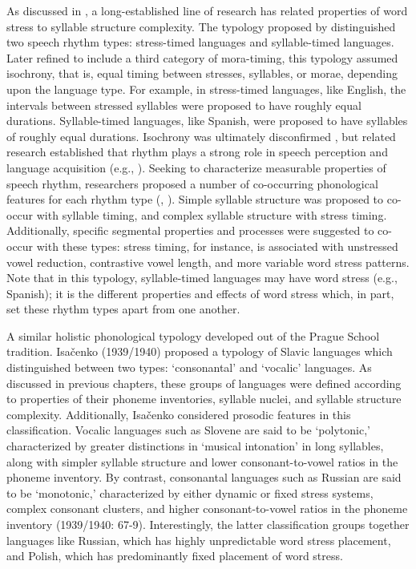   As discussed in , a long-established line of research has related properties of word stress to syllable structure complexity. The typology proposed by \citet{Pike1945} distinguished two speech rhythm types: stress-timed languages and syllable-timed languages. Later refined to include a third category of mora-timing, this typology assumed isochrony, that is, equal timing between stresses, syllables, or morae, depending upon the language type. For example, in stress-timed languages, like English, the intervals between stressed syllables were proposed to have roughly equal durations. Syllable-timed languages, like Spanish, were proposed to have syllables of roughly equal durations. Isochrony was ultimately disconfirmed \citep{Roach1982}, but related research established that rhythm plays a strong role in speech perception and language acquisition (e.g., \citealt{CutlerMehler1993}). Seeking to characterize measurable properties of speech rhythm, researchers proposed a number of co-occurring phonological features for each rhythm type (\citealt{Dauer1983}, \citealt{Auer1993}). Simple syllable structure was proposed to co-occur with syllable timing, and complex syllable structure with stress timing. Additionally, specific segmental properties and processes were suggested to co-occur with these types: stress timing, for instance, is associated with unstressed vowel reduction, contrastive vowel length, and more variable word stress patterns. Note that in this typology, syllable-timed languages may have word stress (e.g., Spanish); it is the different properties and effects of word stress which, in part, set these rhythm types apart from one another.

  A similar holistic phonological typology developed out of the Prague School tradition. Isačenko (1939/1940) proposed a typology of Slavic languages which distinguished between two types: ‘consonantal’ and ‘vocalic’ languages. As discussed in previous chapters, these groups of languages were defined according to properties of their phoneme inventories, syllable nuclei, and syllable structure complexity. Additionally, Isačenko considered prosodic features in this classification. Vocalic languages such as Slovene are said to be ‘polytonic,’ characterized by greater distinctions in ‘musical intonation’ in long syllables, along with simpler syllable structure and lower consonant-to-vowel ratios in the phoneme inventory. By contrast, consonantal languages such as Russian are said to be ‘monotonic,’ characterized by either dynamic or fixed stress systems, complex consonant clusters, and higher consonant-to-vowel ratios in the phoneme inventory (1939/1940: 67-9). Interestingly, the latter classification groups together languages like Russian, which has highly unpredictable word stress placement, and Polish, which has predominantly fixed placement of word stress.

